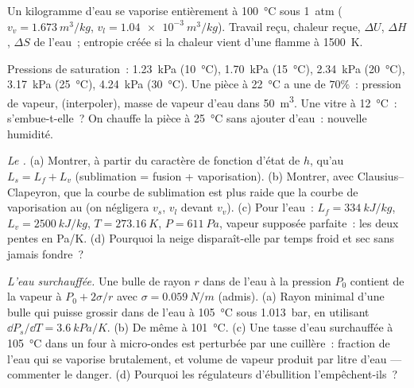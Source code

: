 \begin{exercise}[$\star\star$]\label{exo:b1:phase-changes:8}
Un kilogramme d'eau se vaporise entièrement à \qty{100}{\degreeCelsius} sous
\qty{1}{atm} ($v_v = \qty{1.673}{m^3/kg}$, $v_l = \qty{1.04e-3}{m^3/kg}$).
Travail reçu, chaleur reçue, $\Delta U$, $\Delta H$, $\Delta S$ de l'eau~;
entropie créée si la chaleur vient d'une flamme à \qty{1500}{K}.
\end{exercise}

\begin{exercise}[$\star\star$]\label{exo:b1:phase-changes:9}
Pressions de saturation~: \qty{1.23}{kPa} (\qty{10}{\degreeCelsius}), \qty{1.70}{kPa}
(\qty{15}{\degreeCelsius}), \qty{2.34}{kPa} (\qty{20}{\degreeCelsius}), \qty{3.17}{kPa}
(\qty{25}{\degreeCelsius}), \qty{4.24}{kPa} (\qty{30}{\degreeCelsius}). Une
pièce à \qty{22}{\degreeCelsius} a une  de $70\%$~: pression
de vapeur,  (interpoler), masse de vapeur d'eau dans
\qty{50}{m^3}. Une vitre à \qty{12}{\degreeCelsius}~: s'embue-t-elle~? On
chauffe la pièce à \qty{25}{\degreeCelsius} sans ajouter d'eau~: nouvelle humidité.
\end{exercise}

\begin{exercise}[$\star\star\star$]\label{exo:b1:phase-changes:10}
\emph{Le .} (a) Montrer, à partir du caractère de fonction d'état
de $h$, qu'au  $L_s = L_f + L_v$ (sublimation = fusion +
vaporisation). (b) Montrer, avec Clausius--Clapeyron, que la courbe de
sublimation est plus raide que la courbe de vaporisation au 
(on négligera $v_s$, $v_l$ devant $v_v$). (c) Pour l'eau~: $L_f = \qty{334}{kJ/kg}$,
$L_v = \qty{2500}{kJ/kg}$, $T = \qty{273.16}{K}$, $P = \qty{611}{Pa}$, vapeur
supposée parfaite~: les deux pentes en \unit{Pa/K}. (d) Pourquoi la neige
disparaît-elle par temps froid et sec sans jamais fondre~?
\end{exercise}

\begin{exercise}[$\star\star\star$]\label{exo:b1:phase-changes:11}
\emph{L'eau surchauffée.} Une bulle de rayon $r$ dans de l'eau à la pression
$P_0$ contient de la vapeur à $P_0 + 2\sigma/r$ avec $\sigma = \qty{0.059}{N/m}$
(admis). (a) Rayon minimal d'une bulle qui puisse grossir dans de l'eau à
\qty{105}{\degreeCelsius} sous \qty{1.013}{bar}, en utilisant
$\dd P_s/\dd T = \qty{3.6}{kPa/K}$. (b) De même à \qty{101}{\degreeCelsius}.
(c) Une tasse d'eau surchauffée à \qty{105}{\degreeCelsius} dans un four à
micro-ondes est perturbée par une cuillère~: fraction de l'eau qui se
vaporise brutalement, et volume de vapeur produit par litre d'eau --- commenter
le danger. (d) Pourquoi les régulateurs d'ébullition l'empêchent-ils~?
\end{exercise}

